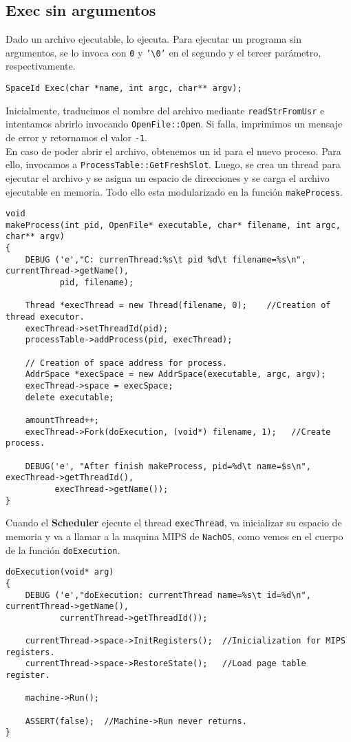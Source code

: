 \subsection*{Exec sin argumentos} \label{exec_without_args}
Dado un archivo ejecutable, lo ejecuta. Para ejecutar un programa sin argumentos, se lo invoca con \texttt{0} y \texttt{'\textbackslash 0'} en el segundo y el tercer parámetro, respectivamente.
\begin{lstlisting}[style=C]
SpaceId Exec(char *name, int argc, char** argv);
\end{lstlisting}
Inicialmente, traducimos el nombre del archivo mediante \texttt{readStrFromUsr} e intentamos abrirlo invocando \texttt{OpenFile::Open}. Si falla, imprimimos un mensaje de error y retornamos el valor \texttt{-1}.\\
En caso de poder abrir el archivo, obtenemos un id para el nuevo proceso. Para ello, invocamos a \texttt{ProcessTable::GetFreshSlot}. Luego, se crea un thread para ejecutar el archivo y se asigna un espacio de direcciones y se carga el archivo ejecutable en memoria. Todo ello esta modularizado en la función \texttt{makeProcess}.
\begin{lstlisting}[style=C]
void
makeProcess(int pid, OpenFile* executable, char* filename, int argc, char** argv)
{
    DEBUG ('e',"C: currenThread:%s\t pid %d\t filename=%s\n", currentThread->getName(),
           pid, filename);
    
    Thread *execThread = new Thread(filename, 0);    //Creation of thread executor.
    execThread->setThreadId(pid);
    processTable->addProcess(pid, execThread);

    // Creation of space address for process.
    AddrSpace *execSpace = new AddrSpace(executable, argc, argv);
    execThread->space = execSpace;
    delete executable;

    amountThread++;
    execThread->Fork(doExecution, (void*) filename, 1);   //Create process.

    DEBUG('e', "After finish makeProcess, pid=%d\t name=$s\n", execThread->getThreadId(),
          execThread->getName());
}
\end{lstlisting}
Cuando el \textbf{Scheduler} ejecute el thread \texttt{execThread}, va inicializar su espacio de memoria y va a llamar a la maquina MIPS de \texttt{NachOS}, como vemos en el cuerpo de la función \texttt{doExecution}.
\begin{lstlisting}[style=C]
doExecution(void* arg)
{
    DEBUG ('e',"doExecution: currentThread name=%s\t id=%d\n", currentThread->getName(),
           currentThread->getThreadId());

	currentThread->space->InitRegisters();  //Inicialization for MIPS registers.
	currentThread->space->RestoreState();   //Load page table register.

 	machine->Run();	

    ASSERT(false);  //Machine->Run never returns.
}
\end{lstlisting}
